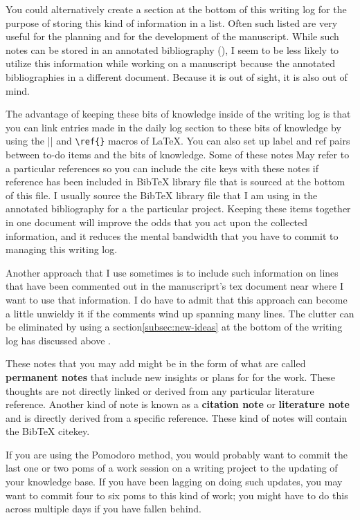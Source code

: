 \documentclass[10pt,letterpaper]{article}
\begin{document}
You could alternatively create a section at the bottom of this writing log for the purpose of storing this kind of information in a list.
Often such listed are very useful for the planning and for the development of the manuscript.
While such notes can be stored in an annotated bibliography (), I seem to be less likely to utilize this information while working on a manuscript because the annotated bibliographies in a different document.
Because it is out of sight, it is also out of mind.

The advantage of keeping these bits of knowledge inside of the writing log is that you can link entries made in the daily log section to these bits of knowledge by using the \verb||\label{}|| and \verb|\ref{}| macros of LaTeX.
You can also set up label and ref pairs between to-do items and the bits of knowledge.
Some of these notes May refer to a particular references so you can include the cite keys with these notes if reference has been included in BibTeX library file that is sourced at the bottom of this file.
I usually source the BibTeX library file that I am using in the annotated bibliography for a the particular project.
Keeping these items together in one document will improve the odds that you act upon the collected information, and it reduces the mental bandwidth that you have to commit to managing this writing log.

Another approach that I use sometimes is to include such information on lines that have been commented out in the manuscriprt's tex document near where I want to use that information.
I do have to admit that this approach can become a little unwieldy it if the comments wind up spanning many lines.
The clutter can be eliminated by using a section\ref{subsec:new-ideas} at the bottom of the writing log has discussed above .

These notes that you may add might be in the form of what are called \textbf{permanent notes} that include new insights or plans for for the work.
These thoughts are not directly linked or derived from any particular literature reference.
Another kind of note is known as a \textbf{citation note} or \textbf{literature note} and is directly derived from a specific reference.
These kind of notes will contain the BibTeX citekey.

If you are using the Pomodoro method, you would probably want to commit the last one or two poms of a work session on a writing project to the updating of your knowledge base.
If you have been lagging on doing such updates, you may want to commit four to six poms to this kind of work; you might have to do this across multiple days if you have fallen behind.
\end{document}
